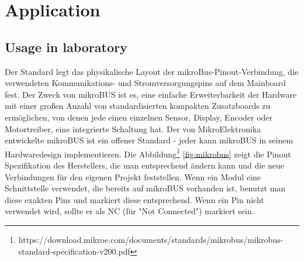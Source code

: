 \chapter{Application}

\section{Usage in laboratory}
\label{sec:usage}
Der Standard legt das physikalische Layout der mikroBus-Pinout-Verbindung, die verwendeten Kommunikations- und Stromversorgungspins auf dem Mainboard fest. Der Zweck von mikroBUS ist es, eine einfache Erweiterbarkeit der Hardware mit einer großen Anzahl von standardisierten kompakten Zusatzboards zu ermöglichen, von denen jede einen einzelnen Sensor, Display, Encoder oder Motortreiber, eine integrierte Schaltung hat. Der von MikroElektronika entwickelte mikroBUS ist ein offener Standard - jeder kann mikroBUS in seinem Hardwaredesign implementieren. Die Abbildung\footnote{https://download.mikroe.com/documents/standards/mikrobus/mikrobus-standard-specification-v200.pdf} \ref{fig:mikrobus} zeigt die Pinout Spezifikation des Herstellers, die man entsprechend ändern kann und die neue Verbindungen für den eigenen Projekt feststellen. Wenn ein Modul eine Schnittstelle verwendet, die bereits auf mikroBUS vorhanden ist, benutzt man diese exakten Pins und markiert diese entsprechend. Wenn ein Pin nicht verwendet wird, sollte er als NC (für "Not Connected") markiert sein. 